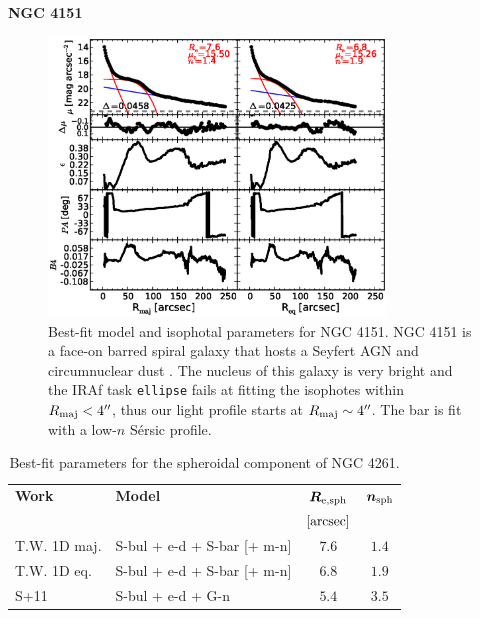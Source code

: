 \documentclass[preprint2]{emulateapj}
\newcommand{\fitfigurewidth}{0.8\textwidth}
\begin{document}
  \clearpage\newpage\noindent
  {\bf NGC 4151 \\}

  \begin{figure}[h]
  \begin{center}
  \includegraphics[width=\fitfigurewidth]{images/n4151_1Dfit.eps}
  \caption{Best-fit model and isophotal parameters for NGC 4151.
  NGC 4151 is a face-on barred spiral galaxy that hosts a Seyfert AGN \citep{veroncettyveron2006} 
  and circumnuclear dust \citep{pott2010}.
  The nucleus of this galaxy is very bright and the IRAf task {\tt ellipse} fails at fitting the isophotes within $R_{\rm maj} < 4''$, 
  thus our light profile starts at $R_{\rm maj} \sim 4''$. 
  The bar is fit with a low-$n$ S\'ersic profile.  
  }
  \end{center}
  \end{figure}

  \begin{table}[h]
  \small
  \caption{Best-fit parameters for the spheroidal component of NGC 4261.}
  \begin{center}
  \begin{tabular}{llcc}
  \hline
  {\bf Work} & {\bf Model}   & $\bm R_{\rm e,sph}$    & $\bm n_{\rm sph}$ \\
    &  &  $[\rm arcsec]$ & \\
  \hline
  T.W. 1D maj. & S-bul + e-d + S-bar [+ m-n] & $7.6$  &  $1.4$ \\
  T.W. 1D eq.  & S-bul + e-d + S-bar [+ m-n] & $6.8$  &  $1.9$ \\
  \hline
  S+11         & S-bul + e-d + G-n         & $5.4$  &  $3.5$ \\
  \hline
  \end{tabular}
  \end{center}
  \label{tab:n4151}
  \end{table}
\end{document}

